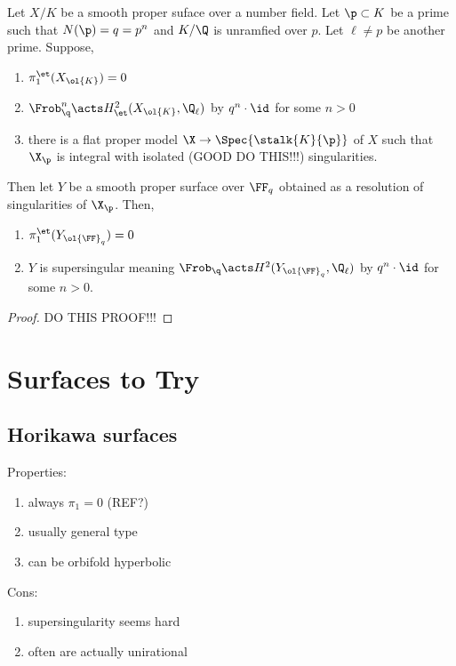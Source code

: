 \documentclass[12pt]{article}
\begin{document}
\begin{prop}
Let $X / K$ be a smooth proper suface over a number field. Let $\p \subset K$ be a prime such that $N(\p) = q = p^n$ and $K / \Q$ is unramfied over $p$. Let $\ell \neq p$ be another prime. Suppose,
\begin{enumerate}
\item $\pi_1^{\et}(X_{\ol{K}}) = 0$
\item $\Frob_{\q}^n \acts H^2_{\et}(X_{\ol{K}}, \Q_{\ell})$ by $q^n \cdot \id$ for some $n > 0$ 
\item there is a flat proper model $\X \to \Spec{\stalk{K}{\p}}$ of $X$ such that $\X_\p$ is integral with isolated (GOOD DO THIS!!!) singularities.
\end{enumerate}
Then let $Y$ be a smooth proper surface over $\FF_q$ obtained as a resolution of singularities of $\X_{\p}$. Then,
\begin{enumerate}
\item $\pi_1^{\et}(Y_{\ol{\FF}_q}) = 0$
\item $Y$ is supersingular meaning $\Frob_{\q} \acts H^2(Y_{\ol{\FF}_q}, \Q_\ell)$ by $q^n \cdot \id$ for some $n > 0$. 
\end{enumerate}
\end{prop}

\begin{proof}
DO THIS PROOF!!!
\end{proof}







\section{Surfaces to Try}

\subsection{Horikawa surfaces}

Properties:
\begin{enumerate}
\item always $\pi_1 = 0$ (REF?)
\item usually general type 
\item can be orbifold hyperbolic
\end{enumerate}

Cons:

\begin{enumerate}
\item supersingularity seems hard
\item often are actually unirational
\end{enumerate}
\end{document}
